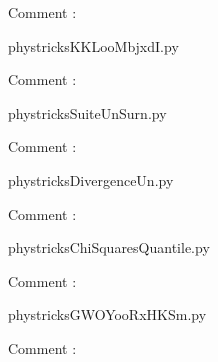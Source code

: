     Comment : 

    \clearpage
    


    \newcommand{\CaptionFigKKLooMbjxdI}{<+Type your caption here+>}
    \begin{center}
        
    \end{center}
    phystricksKKLooMbjxdI.py

    Comment : 

    \clearpage
    


    \newcommand{\CaptionFigSuiteUnSurn}{<+Type your caption here+>}
    \begin{center}
        
    \end{center}
    phystricksSuiteUnSurn.py

    Comment : 

    \clearpage
    


    \newcommand{\CaptionFigDivergenceUn}{<+Type your caption here+>}
    \begin{center}
        
    \end{center}
    phystricksDivergenceUn.py

    Comment : 

    \clearpage
    


    \newcommand{\CaptionFigChiSquaresQuantile}{<+Type your caption here+>}
    \begin{center}
        
    \end{center}
    phystricksChiSquaresQuantile.py

    Comment : 

    \clearpage
    


    \newcommand{\CaptionFigGWOYooRxHKSm}{<+Type your caption here+>}
    \begin{center}
        
    \end{center}
    phystricksGWOYooRxHKSm.py

    Comment : 

    \clearpage
    

